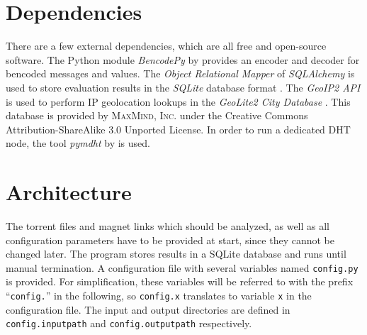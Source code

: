 \documentclass[10pt, a4paper, twoside=false, headsepline]{scrbook}
\renewcommand{\_}{\origunderscore\allowbreak}
\newcommand{\config}[1]{\texttt{config.\allowbreak #1}}
\begin{document}
\section{Dependencies}
\label{dep}
There are a few external dependencies, which are all free and open-source software. The Python module \emph{BencodePy} by \textcite{bencodepy} provides an encoder and decoder for bencoded messages and values. The \emph{Object Relational Mapper} of \emph{SQLAlchemy} \cite{sqlalchemy} is used to store evaluation results in the \emph{SQLite} database format \cite{sqlite}. The \emph{GeoIP2 API} \cite{geoip2-api} is used to perform IP geolocation lookups in the \emph{GeoLite2 City Database} \cite{geolite2-db}. This database is provided by \textsc{MaxMind, Inc.} under the Creative Commons Attribution-ShareAlike 3.0 Unported License. In order to run a dedicated DHT node, the tool \emph{pymdht} by \textcite{pymdht} is used.

\section{Architecture}
\label{arch}
The torrent files and magnet links which should be analyzed, as well as all configuration parameters have to be provided at start, since they cannot be changed later. The program stores results in a SQLite database and runs until manual termination. A configuration file with several variables named \texttt{config.py} is provided. For simplification, these variables will be referred to with the prefix ``\texttt{config.}'' in the following, so \config{x} translates to variable \texttt{x} in the configuration file. The input and output directories are defined in \config{input\_path} and \config{output\_path} respectively.
\end{document}
